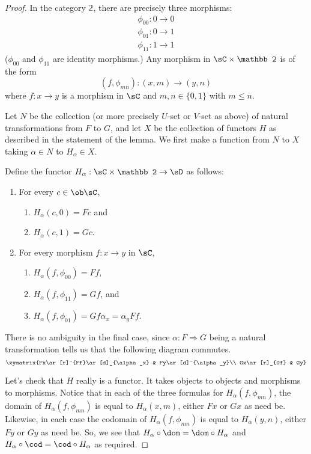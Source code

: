 \documentclass[../../main]{subfiles}
\begin{document}
\begin{proof}
	In the category ${\mathbb 2}$, there are precisely three morphisms:
	\[\begin{array}{l}\phi_{00}:0\rightarrow 0\\ \phi_{01}:0\rightarrow 1\\
	\phi_{11}:1\rightarrow 1\end{array}\] ($\phi_{00}$ and $\phi_{11}$ are
	identity morphisms.) Any morphism in $\sC\times\mathbb 2$ is of the form
	\[(f,\phi_{mn}):(x,m)\rightarrow(y,n)\] where $f:x\rightarrow y$ is a
	morphism in $\sC$ and $m,n\in\{0,1\}$ with $m\le n$.

	Let $N$ be the collection (or more precisely $U$-set or $V$-set as above) of
	natural transformations from $F$ to $G$, and let $X$ be the collection of
	functors $H$ as described in the statement of the lemma. We first make a
	function from $N$ to $X$ taking $\alpha\in N$ to $H_\alpha\in X$.

	Define the functor $H_\alpha:\sC\times{\mathbb 2}\rightarrow\sD$ as follows:
	\begin{enumerate}
		\item For every $c\in\ob\sC$,
			\begin{enumerate}
				\item $H_\alpha(c,0)=Fc$ and
				\item $H_\alpha(c,1)=Gc$.
			\end{enumerate}
		\item For every morphism $f:x\rightarrow y$ in $\sC$,
			\begin{enumerate}
				\item $H_\alpha(f,\phi_{00})=Ff$,
				\item $H_\alpha(f,\phi_{11})=Gf$, and
				\item $H_\alpha(f,\phi_{01})=Gf\alpha_x=\alpha_yFf$.
			\end{enumerate}
	\end{enumerate}
	There is no ambiguity in the final case, since $\alpha:F\Rightarrow G$ being
	a natural transformation tells us that the following diagram commutes.
	\[\xymatrix{Fx\ar[r]^{Ff}\ar[d]_{\alpha_x} & Fy\ar[d]^{\alpha_y}\\
	Gx\ar[r]_{Gf} & Gy}\]

	Let's check that $H$ really is a functor. It takes objects to objects and
	morphisms to morphisms. Notice that in each of the three  formulas for
	$H_\alpha(f,\phi_{mn})$, the domain of $H_\alpha(f,\phi_{mn})$ is equal to
	$H_\alpha(x,m)$, either $Fx$ or $Gx$ as need be. Likewise, in each case the
	codomain of $H_\alpha(f,\phi_{mn})$ is equal to $H_\alpha(y,n)$, either $Fy$
	or $Gy$ as need be. So, we see that $H_\alpha\circ\dom=\dom\circ H_\alpha$
	and $H_\alpha\circ\cod=\cod\circ H_\alpha$ as required.


\end{proof}
\end{document}
